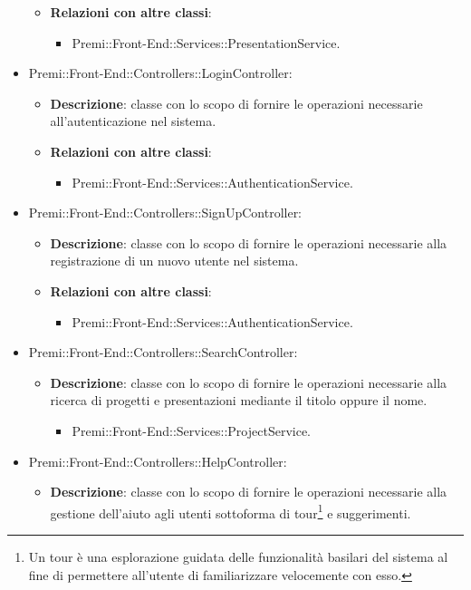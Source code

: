 \begin{itemize}
\begin{itemize}
				\item \textbf{Relazioni con altre classi}:
				\begin{itemize}
					\item Premi::Front-End::Services::PresentationService.
				\end{itemize}
			\end{itemize}
		\item  Premi::Front-End::Controllers::LoginController: 
			 \begin{itemize}
				\item \textbf{Descrizione}: classe con lo scopo di fornire le operazioni necessarie all'autenticazione nel sistema.
				\item \textbf{Relazioni con altre classi}:
				\begin{itemize}
					\item Premi::Front-End::Services::AuthenticationService.
				\end{itemize}
			\end{itemize}
		\item  Premi::Front-End::Controllers::SignUpController: 
			 \begin{itemize}
				\item \textbf{Descrizione}: classe con lo scopo di fornire le operazioni necessarie alla registrazione di un nuovo utente nel sistema.
				\item \textbf{Relazioni con altre classi}:
				\begin{itemize}
					\item Premi::Front-End::Services::AuthenticationService.
				\end{itemize}
			\end{itemize}
		\item  Premi::Front-End::Controllers::SearchController: 
			 \begin{itemize}
				\item \textbf{Descrizione}: classe con lo scopo di fornire le operazioni necessarie alla ricerca di progetti e presentazioni mediante il titolo oppure il nome.
				\begin{itemize}
					\item Premi::Front-End::Services::ProjectService.
				\end{itemize}
			\end{itemize}
		\item  Premi::Front-End::Controllers::HelpController: 
			 \begin{itemize}
				\item \textbf{Descrizione}: classe con lo scopo di fornire le operazioni necessarie alla gestione dell'aiuto agli utenti sottoforma di tour\footnote{Un tour è una esplorazione guidata delle funzionalità basilari del sistema al fine di permettere all'utente di familiarizzare velocemente con esso.} e suggerimenti.
			\end{itemize}
	\end{itemize}
\newpage
